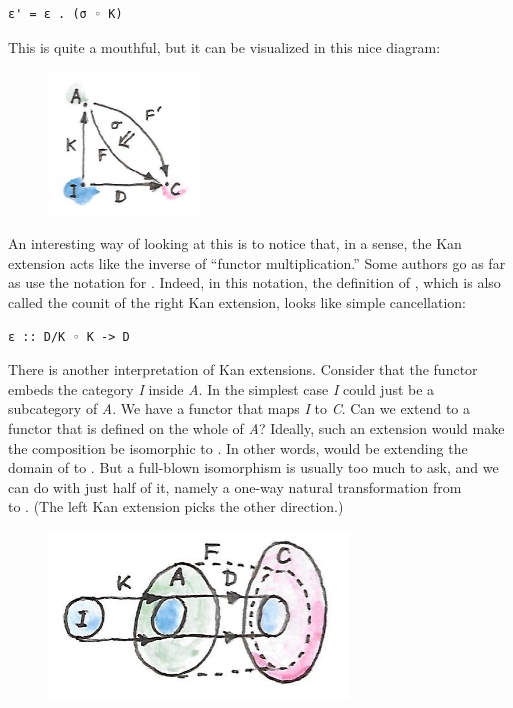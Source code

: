 \begin{verbatim}
ε' = ε . (σ ◦ K)
\end{verbatim}
This is quite a mouthful, but it can be visualized in this nice diagram:

\begin{figure}[H]
\centering
\includegraphics[width=40mm]{images/kan7.jpg}
\end{figure}

\noindent
An interesting way of looking at this is to notice that, in a sense, the
Kan extension acts like the inverse of ``functor multiplication.'' Some
authors go as far as use the notation  for .
Indeed, in this notation, the definition of , which is also
called the counit of the right Kan extension, looks like simple
cancellation:

\begin{verbatim}
ε :: D/K ◦ K -> D
\end{verbatim}
There is another interpretation of Kan extensions. Consider that the
functor  embeds the category \emph{I} inside \emph{A}. In the
simplest case \emph{I} could just be a subcategory of \emph{A}. We have
a functor  that maps \emph{I} to \emph{C}. Can we extend
 to a functor  that is defined on the whole of
\emph{A}? Ideally, such an extension would make the composition
 be isomorphic to . In other words, 
would be extending the domain of  to . But a
full-blown isomorphism is usually too much to ask, and we can do with
just half of it, namely a one-way natural transformation  from\\
 to . (The left Kan extension picks the other
direction.)

\begin{figure}[H]
\centering
\includegraphics[width=80mm]{images/kan6.jpg}
\end{figure}

